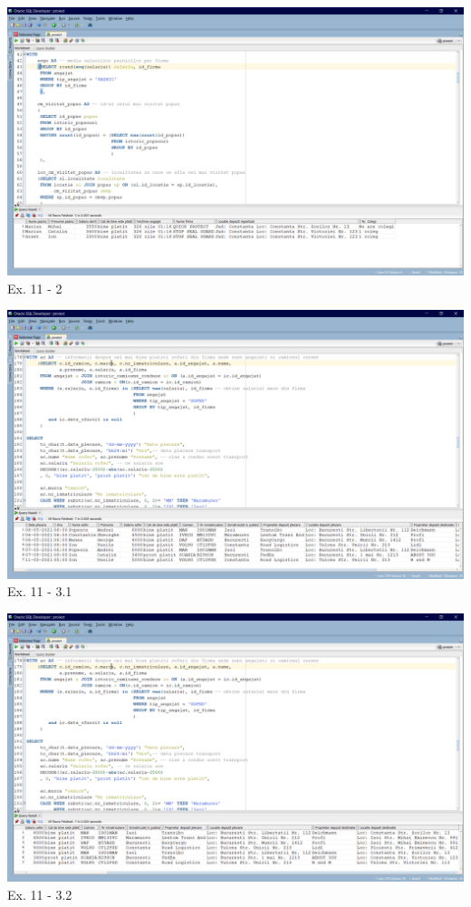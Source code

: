 \documentclass[12pt, a4paper]{article}
\begin{document}
\includegraphics[width=\textwidth]{ex11_2.png}
\label{Ex11 2}
\centering Ex. 11 - 2

\includegraphics[width=\textwidth]{ex11_3_1.png}
\label{Ex11 3.1}
\centering Ex. 11 - 3.1

\includegraphics[width=\textwidth]{ex11_3_2.png}
\label{Ex11 3.2}
\centering Ex. 11 - 3.2
\end{document}
